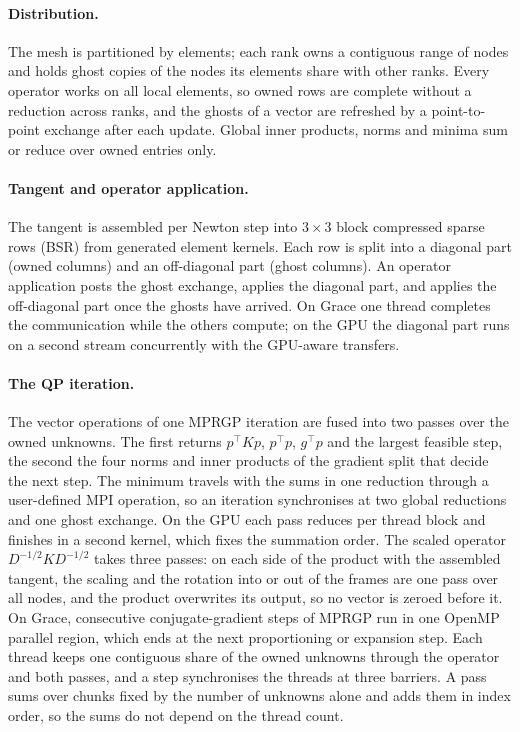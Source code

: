 \documentclass[sigconf,nonacm]{acmart}
\begin{document}
\paragraph{Distribution.} The mesh is partitioned by elements; each rank owns a contiguous range of
nodes and holds ghost copies of the nodes its elements share with other ranks. Every operator
works on all local elements, so owned rows are complete without a reduction across ranks, and the
ghosts of a vector are refreshed by a point-to-point exchange after each update. Global inner
products, norms and minima sum or reduce over owned entries only.

\paragraph{Tangent and operator application.} The tangent is assembled per Newton step into
$3\times3$ block compressed sparse rows (BSR) from generated element kernels. Each row is split
into a diagonal part (owned columns) and an off-diagonal part (ghost columns). An operator
application posts the ghost exchange, applies the diagonal part, and applies the off-diagonal
part once the ghosts have arrived. On Grace one thread completes the communication while the
others compute; on the GPU the diagonal part runs on a second stream concurrently with the
GPU-aware transfers.

\paragraph{The QP iteration.} The vector operations of one MPRGP iteration are fused into two
passes over the owned unknowns. The first returns $p^\top Kp$, $p^\top p$, $g^\top p$ and the
largest feasible step, the second the four norms and inner products of the gradient split that
decide the next step. The minimum travels with the sums in one reduction through a user-defined
MPI operation, so an iteration synchronises at two global reductions and one ghost exchange. On
the GPU each pass reduces per thread block and finishes in a second kernel, which fixes the
summation order. The scaled operator $D^{-1/2}KD^{-1/2}$ takes three passes: on each side of the
product with the assembled tangent, the scaling and the rotation into or out of the frames are one
pass over all nodes, and the product overwrites its output, so no vector is zeroed before it.
On Grace, consecutive conjugate-gradient steps of MPRGP run in one OpenMP parallel region, which
ends at the next proportioning or expansion step. Each thread keeps one contiguous share of the
owned unknowns through the operator and both passes, and a step synchronises the threads at three
barriers. A pass sums over chunks fixed by the number of unknowns alone and adds them in index
order, so the sums do not depend on the thread count.
\end{document}

